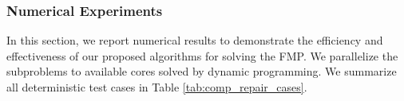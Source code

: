 \documentclass[../main]{subfiles}
\begin{document}
\subsubsection{Numerical Experiments}\label{sec.fmp:numerical-experiments}

In this section, we report numerical results to
demonstrate the efficiency and effectiveness of our proposed algorithms
for solving the FMP. We parallelize the
subproblems to available cores solved by dynamic programming.
We summarize all deterministic test cases in Table \ref{tab:comp_repair_cases}.
\end{document}
